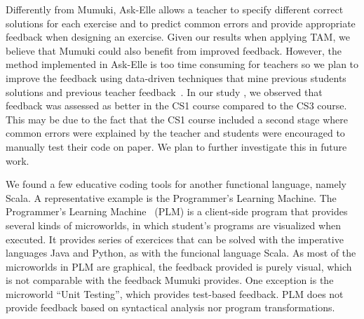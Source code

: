 Differently from Mumuki, Ask-Elle allows a teacher to specify different correct solutions for each exercise and to predict common errors and provide appropriate feedback when designing an exercise. Given our results when applying TAM, we believe that Mumuki could also benefit from improved feedback. However, the method implemented in Ask-Elle is too time consuming for teachers so we plan to improve the feedback using data-driven techniques that mine previous students solutions and previous teacher feedback~\cite{Price:2015}. In our study , we observed that feedback was assessed as better in the CS1 course compared to the CS3 course. This may be due to the fact that the CS1 course included a second stage where common errors were explained by the teacher and students were encouraged to manually test their code on paper. We plan to further investigate this in future work.  

We found a few educative coding tools for another functional language, namely Scala. A representative example is the Programmer's Learning Machine. 
The Programmer's Learning Machine~\cite{quinson2015teaching} (PLM) is a client-side program
that provides several kinds of microworlds, in which student's programs are visualized
when executed. It provides series of exercices that can be solved with the imperative
languages Java and Python, as with the funcional language Scala.
As most of the microworlds in PLM are graphical, the
feedback provided is purely visual, which is not comparable with the feedback Mumuki provides. One exception is the
microworld ``Unit Testing'', which provides test-based feedback. PLM does not provide
feedback based on syntactical analysis nor program transformations.